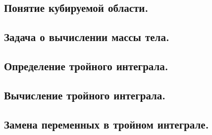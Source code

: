
\subsection{Понятие кубируемой области.}
 


\newpage
\subsection{Задача о вычислении массы тела.}
 


\newpage
\subsection{Определение тройного интеграла.}



\newpage
\subsection{Вычисление тройного интеграла.}



\newpage
\subsection{Замена переменных в тройном интеграле.}
